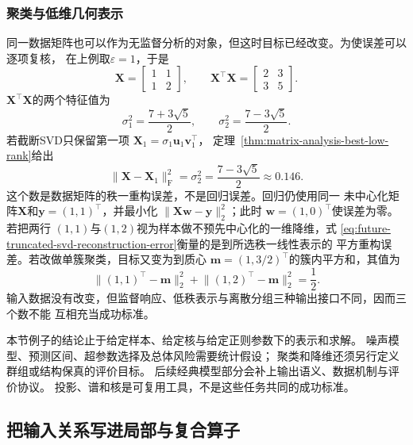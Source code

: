 \subsubsection{聚类与低维几何表示}
\label{sec:future-prediction-clusters-low-dimensional-relations}

同一数据矩阵也可以作为无监督分析的对象，但这时目标已经改变。为使误差可以逐项复核，
在上例取\(\varepsilon=1\)，于是
\[
  \bm{X}=
  \begin{bmatrix}
    1&1\\
    1&2
  \end{bmatrix},
  \qquad
  \bm{X}^{\top}\bm{X}=
  \begin{bmatrix}
    2&3\\
    3&5
  \end{bmatrix}.
\]
\(\bm{X}^{\top}\bm{X}\)的两个特征值为
\[
  \sigma_1^2=\frac{7+3\sqrt5}{2},
  \qquad
  \sigma_2^2=\frac{7-3\sqrt5}{2}.
\]
若截断SVD只保留第一项
\(\bm{X}_1=\sigma_1\bm{u}_1\bm{v}_1^{\top}\)，
定理~\ref{thm:matrix-analysis-best-low-rank}给出
\begin{equation}
  \lVert\bm{X}-\bm{X}_1\rVert_{\mathrm F}^2
  =
  \sigma_2^2
  =
  \frac{7-3\sqrt5}{2}
  \approx0.146.
  \label{eq:future-truncated-svd-reconstruction-error}
\end{equation}
这个数是数据矩阵的秩一重构误差，不是回归误差。回归仍使用同一
未中心化矩阵\(\bm{X}\)和\(\bm{y}=(1,1)^{\top}\)，并最小化
\(\lVert\bm{X}\bm{w}-\bm{y}\rVert_2^2\)；此时
\(\bm{w}=(1,0)^{\top}\)使误差为零。若把两行
\((1,1)\)与\((1,2)\)视为样本做不预先中心化的一维降维，式
\eqref{eq:future-truncated-svd-reconstruction-error}衡量的是到所选秩一线性表示的
平方重构误差。若改做单簇聚类，目标又变为到质心
\(\bm m=(1,3/2)^{\top}\)的簇内平方和，其值为
\[
  \lVert(1,1)^{\top}-\bm m\rVert_2^2
  +
  \lVert(1,2)^{\top}-\bm m\rVert_2^2
  =
  \frac12.
\]
输入数据没有改变，但监督响应、低秩表示与离散分组三种输出接口不同，因而三个数不能
互相充当成功标准。

本节例子的结论止于给定样本、给定核与给定正则参数下的表示和求解。
噪声模型、预测区间、超参数选择及总体风险需要统计假设；
聚类和降维还须另行定义群组或结构保真的评价目标。
后续经典模型部分会补上输出语义、数据机制与评价协议。
投影、谱和核是可复用工具，不是这些任务共同的成功标准。

\subsection{把输入关系写进局部与复合算子}
\label{sec:future-neural-structure-representation}


